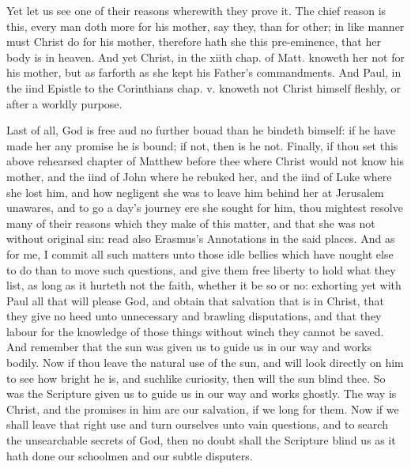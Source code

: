 Yet let us see one of their reasons wherewith they prove 
it. The chief reason is this, every man doth more for his 
mother, say they, than for other; in like manner must 
Christ do for his mother, therefore hath she this pre-eminence,
that her body is in heaven. And yet Christ, in the 
xiith chap. of Matt. knoweth her not for his mother, but 
as farforth as she kept his Father's commandments. And 
Paul, in the iind Epistle to the Corinthians chap. v. knoweth
not Christ himself fleshly, or after a worldly purpose. 

Last of all, God is free aud no further bouad than he 
bindeth bimself: if he have made her any promise he is 
bound; if not, then is he not. Finally, if thou set this 
above rehearsed chapter of Matthew before thee where Christ 
would not know his mother, and the iind of John where 
he rebuked her, and the iind of Luke where she lost him, 
and how negligent she was to leave him behind her at 
Jerusalem unawares, and to go a day's journey ere she 
sought for him, thou mightest resolve many of their reasons 
which they make of this matter, and that she was not without
original sin: read also Erasmus's Annotations in the 
said places. And as for me, I commit all such matters 
unto those idle bellies which have nought else to do than 
to move such questions, and give them free liberty to hold 
what they list, as long as it hurteth not the faith, whether 
it be so or no: exhorting yet with Paul all that will please 
God, and obtain that salvation that is in Christ, that they 
give no heed unto unnecessary and brawling disputations, 
and that they labour for the knowledge of those things 
without winch they cannot be saved. And remember that 
the sun was given us to guide us in our way and works 
bodily. Now if thou leave the natural use of the sun, and 
will look directly on him to see how bright he is, and suchlike 
curiosity, then will the sun blind thee. So was the Scripture 
given us to guide us in our way and works ghostly. The 
way is Christ, and the promises in him are our salvation, if we 
long for them. Now if we shall leave that right use and turn 
ourselves unto vain questions, and to search the unsearchable 
secrets of God, then no doubt shall the Scripture blind us 
as it hath done our schoolmen and our subtle disputers. 


